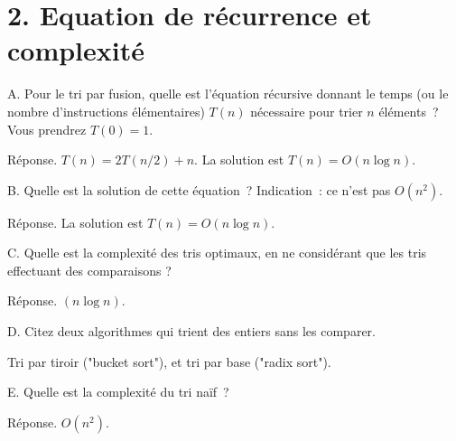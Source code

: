 \documentclass[11pt]{article}
\begin{document}
{
\section*{2. Equation de récurrence et complexité}
A. Pour le tri par fusion, quelle est l'équation récursive
donnant le temps  (ou  le nombre d'instructions élémentaires) $T(n)$ nécessaire pour trier $n$ éléments~? Vous prendrez $T(0)=1$. 

Réponse. $T(n)= 2 T(n/2) + n$. La solution est $T(n)= O(n \log n)$.

B. Quelle est la solution de cette équation~? Indication~: ce n'est pas $O( n^2)$.

Réponse. La solution est $T(n)= O(n \log n)$.

C. Quelle est la complexité des tris optimaux, en ne considérant que les tris effectuant des comparaisons ?


Réponse. $(n \log n)$.


D. Citez deux algorithmes qui trient des entiers sans les comparer.

Tri par tiroir ("bucket sort"), et tri par base ("radix sort").

E. Quelle est la complexité du tri naïf~?

Réponse. $O(n^2)$.

}
\end{document}

